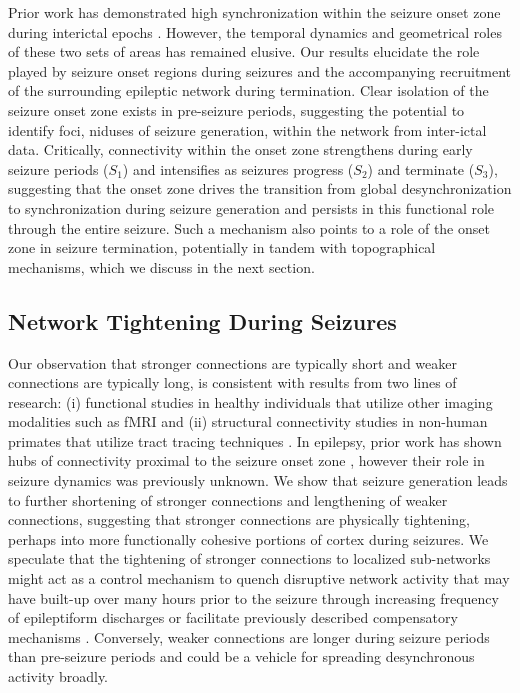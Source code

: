 Prior work has demonstrated high synchronization within the seizure onset zone during interictal epochs \cite{dauwels2009localization, warren2010synchrony}. However, the temporal dynamics and geometrical roles of these two sets of areas has remained elusive. Our results elucidate the role played by seizure onset regions during seizures and the accompanying recruitment of the surrounding epileptic network during termination. Clear isolation of the seizure onset zone exists in pre-seizure periods, suggesting the potential to identify foci, niduses of seizure generation, within the network from inter-ictal data. Critically, connectivity within the onset zone strengthens during early seizure periods ($S_1$) and intensifies as seizures progress ($S_2$) and terminate ($S_3$), suggesting that the onset zone drives the transition from global desynchronization to synchronization during seizure generation and persists in this functional role through the entire seizure. Such a mechanism also points to a role of the onset zone in seizure termination, potentially in tandem with topographical mechanisms, which we discuss in the next section.


\subsection{Network Tightening During Seizures}
Our observation that stronger connections are typically short and weaker connections are typically long, is consistent with results from two lines of research: (i) functional studies in healthy individuals that utilize other imaging modalities such as fMRI \cite{santarnecchi2014efficiency} and (ii) structural connectivity studies in non-human primates that utilize tract tracing techniques \cite{ercsey-ravasz2013predictive}. In epilepsy, prior work has shown hubs of connectivity proximal to the seizure onset zone \cite{schevon2007cortical, zaveri2009localization-related, rummel2013systems-level}, however their role in seizure dynamics was previously unknown. We show that seizure generation leads to further shortening of stronger connections and lengthening of weaker connections, suggesting that stronger connections are physically tightening, perhaps into more functionally cohesive portions of cortex during seizures. We speculate that the tightening of stronger connections to localized sub-networks might act as a control mechanism to quench disruptive network activity that may have built-up over many hours prior to the seizure through increasing frequency of epileptiform discharges \cite{litt2001epileptic} or facilitate previously described compensatory mechanisms \cite{rummel2013systems-level}. Conversely, weaker connections are longer during seizure periods than pre-seizure periods and could be a vehicle for spreading desynchronous activity broadly.


